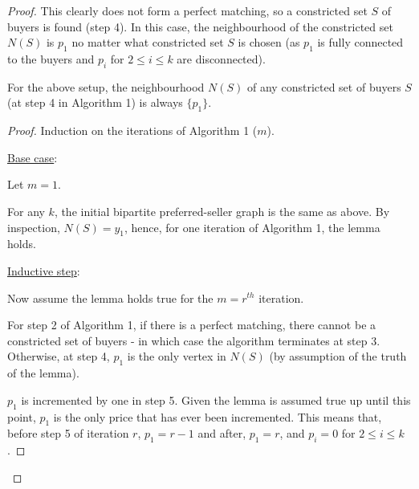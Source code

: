 \begin{enumerate}
\begin{proof}
        \hfil

        This clearly does not form a perfect matching, so a constricted set $S$ of buyers is found (step 4).
        In this case, the neighbourhood of the constricted set $N(S)$ is $p_1$ no matter what constricted set $S$ is chosen (as $p_1$ is fully connected to the buyers and $p_i$ for $2 \leq i \leq k$ are disconnected).

        \begin{lemma}
            For the above setup, the neighbourhood $N(S)$ of any constricted set of buyers $S$ (at step 4 in Algorithm 1) is always $\{p_1\}$.
        \end{lemma}
        \begin{proof}
            Induction on the iterations of Algorithm 1 ($m$).

            \underline{Base case}:

            Let $m = 1$.

            For any $k$, the initial bipartite preferred-seller graph is the same as above.
            By inspection, $N(S) = {y_1}$, hence, for one iteration of Algorithm 1, the lemma holds.

            \underline{Inductive step}:

            Now assume the lemma holds true for the $m = r^{th}$ iteration.

            For step 2 of Algorithm 1, if there is a perfect matching, there cannot be a constricted set of buyers - in which case the algorithm terminates at step 3.
            Otherwise, at step 4, $p_1$ is the only vertex in $N(S)$ (by assumption of the truth of the lemma).

            $p_1$ is incremented by one in step 5.
            Given the lemma is assumed true up until this point, $p_1$ is the only price that has ever been incremented.
            This means that, before step 5 of iteration $r$, $p_1 = r - 1$ and after, $p_1 = r$, and $p_i = 0$ for $2 \leq i \leq k$.


\end{proof}
\end{proof}
\end{enumerate}
